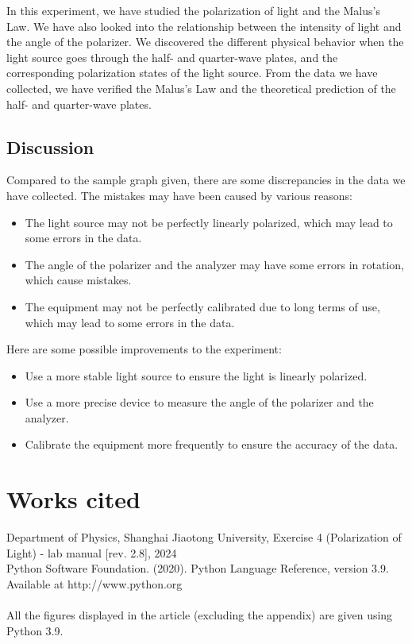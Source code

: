 \documentclass[12pt, a4paper, oneside]{article}
\begin{document}
In this experiment, we have studied the polarization of light and the Malus's Law. We have also looked into the relationship between the intensity of light and the angle of the polarizer.
We discovered the different physical behavior when the light source goes through the half- and quarter-wave plates, and the corresponding polarization states of the light source. 
From the data we have collected, we have verified the Malus's Law and the theoretical prediction of the half- and quarter-wave plates. 

\subsection{Discussion}
\indent

Compared to the sample graph given, there are some discrepancies in the data we have collected. The mistakes may have been caused by various reasons:
\begin{itemize}
	\item The light source may not be perfectly linearly polarized, which may lead to some errors in the data.
	\item The angle of the polarizer and the analyzer may have some errors in rotation, which cause mistakes.
	\item The equipment may not be perfectly calibrated due to long terms of use, which may lead to some errors in the data.
\end{itemize}
Here are some possible improvements to the experiment:
\begin{itemize}
	\item Use a more stable light source to ensure the light is linearly polarized.
	\item Use a more precise device to measure the angle of the polarizer and the analyzer.
	\item Calibrate the equipment more frequently to ensure the accuracy of the data.
\end{itemize}

\section{Works cited}
Department of Physics, Shanghai Jiaotong University, Exercise 4 (Polarization of Light) - lab manual [rev. 2.8], 2024\\
Python Software Foundation. (2020). Python Language Reference, version 3.9. Available at http://www.python.org\\
\\
All the figures displayed in the article (excluding the appendix) are given using Python 3.9.
\pagebreak
\appendix
\end{document}
